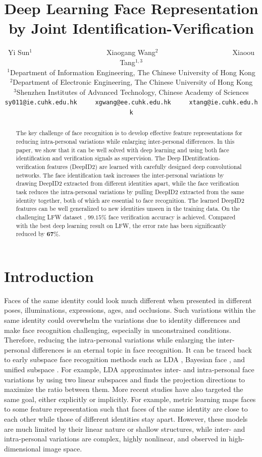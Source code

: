 \documentclass{article} %
\title{Deep Learning Face Representation by Joint Identification-Verification}
\author{Yi Sun$^{1}$~~~~~~~~~~~~~~~~~~~~~Xiaogang Wang$^{2}$~~~~~~~~~~~~~~~~~~~~~Xiaoou Tang$^{1,3}$\\
{\small $^1$Department of Information Engineering, The Chinese University of Hong Kong}\\
{\small $^2$Department of Electronic Engineering, The Chinese University of Hong Kong}\\
{\small $^3$Shenzhen Institutes of Advanced Technology, Chinese Academy of Sciences}\\
{\tt\small sy011@ie.cuhk.edu.hk~~~~~xgwang@ee.cuhk.edu.hk~~~~~xtang@ie.cuhk.edu.hk}
}
\begin{document}
\maketitle

\begin{abstract}
The key challenge of face recognition is to develop effective feature representations for reducing intra-personal variations while enlarging inter-personal differences. In this paper, we show that it can be well solved with deep learning and using both face identification and verification signals as supervision. The Deep IDentification-verification features (DeepID2) are learned with carefully designed deep convolutional networks. The face identification task increases the inter-personal variations by drawing DeepID2 extracted from different identities apart, while the face verification task reduces the intra-personal variations by pulling DeepID2 extracted from the same identity together, both of which are essential to face recognition. The learned DeepID2 features can be well generalized to new identities unseen in the training data. On the challenging LFW dataset \cite{huang2007}, $\bm{99.15\%}$ face verification accuracy is achieved. Compared with the best deep learning result \cite{sun2014} on LFW, the error rate has been significantly reduced by $\bm{67\%}$.
\end{abstract}


\section{Introduction}

Faces of the same identity could look much different when presented in different poses, illuminations, expressions, ages, and occlusions. Such variations within the same identity could overwhelm the variations due to identity differences and make face recognition challenging, especially in unconstrained conditions. Therefore, reducing the intra-personal variations while enlarging the inter-personal differences is an eternal topic in face recognition. It can be traced back to early subspace face recognition methods such as LDA \cite{belhumeur1997}, Bayesian face \cite{moghaddam2000}, and unified subspace \cite{wang2003,wang2004a}. For example, LDA approximates inter- and intra-personal face variations by using two linear subspaces and finds the projection directions to maximize the ratio between them. More recent studies have also targeted the same goal, either explicitly or implicitly. For example, metric learning \cite{guillaumin2009,huang2011,mignon2012} maps faces to some feature representation such that faces of the same identity are close to each other while those of different identities stay apart. However, these models are much limited by their linear nature or shallow structures, while inter- and intra-personal variations are complex, highly nonlinear, and observed in high-dimensional image space.
\end{document}
